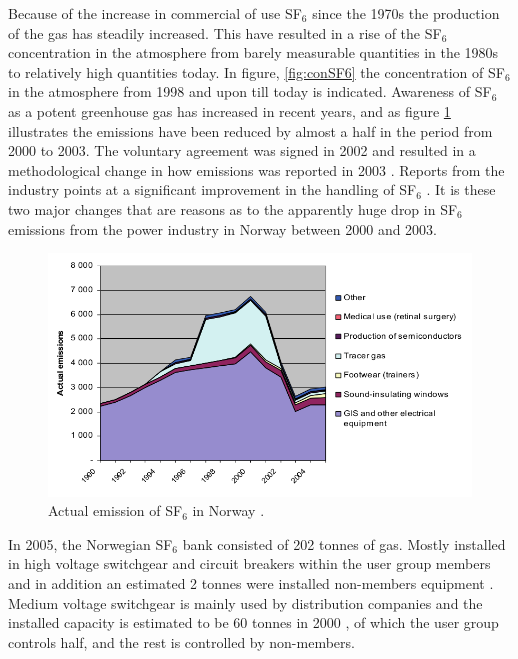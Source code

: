 \documentclass[10pt,a4paper]{article}
\begin{document}
Because of the increase in commercial of use SF$_6$ since the 1970s the production of the gas has steadily increased. This have resulted in a rise of the SF$_6$ concentration in the atmosphere from barely measurable quantities in the 1980s \cite{bib:SF6PI} to relatively high quantities today. In figure, \ref{fig:conSF6} the concentration of SF$_6$ in the atmosphere from 1998 and upon till today is indicated. Awareness of SF$_6$ as a potent greenhouse gas has increased in recent years, and as figure \ref{fig:SF6EmissNor} illustrates the emissions have been reduced by almost a half in the period from 2000 to 2003. The voluntary agreement was signed in 2002 and resulted in a methodological change in how emissions was reported in 2003 \cite{bib:regSF6Miljo}. Reports from the industry points at a significant improvement in the handling of SF$_6$ \cite{bib:StatSF6}. It is these two major changes that are reasons as to the apparently huge drop in SF$_6$ emissions from the power industry in Norway between 2000 and 2003.

\begin{figure}[H]
\centering
\includegraphics[scale=0.6]{Bilder/Theory/emissionsSF6Norway.png}
\caption{Actual emission of SF$_6$ in Norway \cite{bib:StatSF6}.} \label{fig:SF6EmissNor}
\end{figure}

In 2005, the Norwegian SF$_6$ bank consisted of 202 tonnes of gas. Mostly installed in high voltage switchgear and circuit breakers within the user group members and in addition an estimated 2 tonnes were installed non-members equipment \cite{bib:StatSF6}. Medium voltage switchgear is mainly used by distribution companies and the installed capacity is estimated to be 60 tonnes in 2000 \cite{bib:StatSF6}, of which the user group controls half, and the rest is controlled by non-members.
\end{document}
